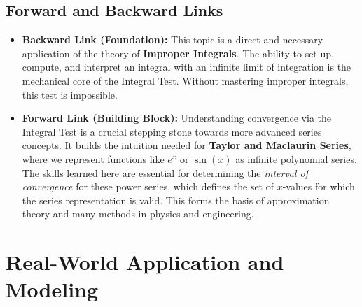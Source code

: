 \documentclass{article}
\begin{document}
\subsection{Forward and Backward Links}
\begin{itemize}
    \item \textbf{Backward Link (Foundation):} This topic is a direct and necessary application of the theory of \textbf{Improper Integrals}. The ability to set up, compute, and interpret an integral with an infinite limit of integration is the mechanical core of the Integral Test. Without mastering improper integrals, this test is impossible.

    \item \textbf{Forward Link (Building Block):} Understanding convergence via the Integral Test is a crucial stepping stone towards more advanced series concepts. It builds the intuition needed for \textbf{Taylor and Maclaurin Series}, where we represent functions like $e^x$ or $\sin(x)$ as infinite polynomial series. The skills learned here are essential for determining the \textit{interval of convergence} for these power series, which defines the set of $x$-values for which the series representation is valid. This forms the basis of approximation theory and many methods in physics and engineering.
\end{itemize}

\section{Real-World Application and Modeling}
\end{document}
